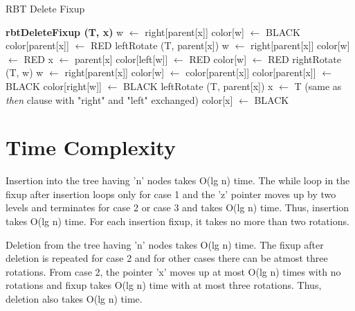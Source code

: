 \documentclass[11pt, oneside, a4paper]{article}
\begin{document}
\begin{algorithm}
\caption {RBT Delete Fixup}
\label {alg4}
\begin{algorithmic}[1]
\STATE \textbf {rbtDeleteFixup (T, x)}
\STATE w $\leftarrow$ right[parent[x]]
\STATE color[w] $\leftarrow$ BLACK
\STATE color[parent[x]] $\leftarrow$ RED
\STATE leftRotate (T, parent[x])
\STATE w $\leftarrow$ right[parent[x]]
\ENDIF
{}
\STATE color[w] $\leftarrow$ RED
\STATE x $\leftarrow$ parent[x]
\ELSE
{}
\STATE color[left[w]] $\leftarrow$ RED
\STATE color[w] $\leftarrow$ RED
\STATE rightRotate (T, w)
\STATE w $\leftarrow$ right[parent[x]]
\ENDIF
\STATE color[w] $\leftarrow$ color[parent[x]]
\STATE color[parent[x]] $\leftarrow$ BLACK
\STATE color[right[w]] $\leftarrow$ BLACK
\STATE leftRotate (T, parent[x])
\STATE x $\leftarrow$ T
\ENDIF
\ELSE
\STATE (same as \emph {then} clause with "right" and "left" exchanged)
\ENDIF
\ENDWHILE
\STATE color[x] $\leftarrow$ BLACK
\end{algorithmic}
\end{algorithm}

\section{Time Complexity}
Insertion into the tree having 'n' nodes takes O(lg n) time.  The while loop in the fixup after insertion loops only for case 1 and the 'z' pointer moves up by two levels and terminates for case 2 or case 3 and takes O(lg n) time.  Thus, insertion takes O(lg n) time.  For each insertion fixup, it takes no more than two rotations.

Deletion from the tree having 'n' nodes takes O(lg n) time.  The fixup after deletion is repeated for case 2 and for other cases there can be atmost three rotations.  From case 2, the pointer 'x' moves up at most O(lg n) times with no rotations and fixup takes O(lg n) time with at most three rotations.  Thus, deletion also takes O(lg n) time.
\end{document}
